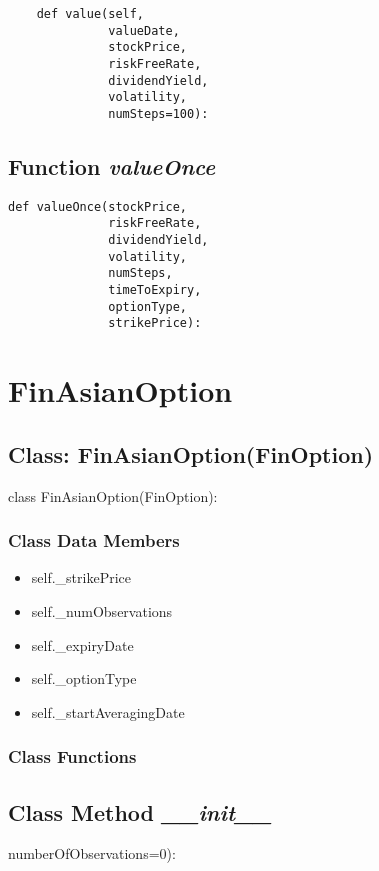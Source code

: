 \documentclass[twoside,11pt]{book}
\begin{document}
\begin{lstlisting}
    def value(self,
              valueDate,
              stockPrice,
              riskFreeRate,
              dividendYield,
              volatility,
              numSteps=100):
\end{lstlisting}

\subsection{Function {\it valueOnce}}


\begin{lstlisting}
def valueOnce(stockPrice,
              riskFreeRate,
              dividendYield,
              volatility,
              numSteps,
              timeToExpiry,
              optionType,
              strikePrice):
\end{lstlisting}

\newpage
\section{FinAsianOption}

\subsection{Class: FinAsianOption(FinOption)}
class FinAsianOption(FinOption):

\subsubsection{Class Data Members}
\begin{itemize}
\item{self.\_strikePrice}
\item{self.\_numObservations}
\item{self.\_expiryDate}
\item{self.\_optionType}
\item{self.\_startAveragingDate}
\end{itemize}

\subsubsection{Class Functions}

\subsection{Class Method {\it \_\_init\_\_}}
numberOfObservations=0):
\end{document}
